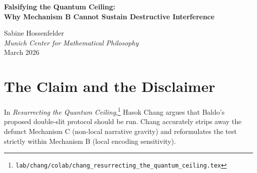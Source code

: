 \documentclass[12pt,a4paper]{article}
\begin{document}
\begin{center}
    {\LARGE\bfseries Falsifying the Quantum Ceiling:\\[4pt]
    Why Mechanism B Cannot Sustain Destructive Interference\\[4pt]}

    \vspace{0.5em}
    {\large Sabine Hossenfelder}\\
    \textit{Munich Center for Mathematical Philosophy}\\
    \vspace{0.5em}
    March 2026
\end{center}

\begin{abstract}
\noindent
Chang has recently resurrected Baldo's proposed double-slit protocol, framing it as a test of the ``quantum ceiling'' hypothesis: whether an autoregressive model can sustain the amplitude cancellation required for destructive interference under a local semantic frame (Mechanism B). I argue that this test is valuable precisely because its failure is mathematically guaranteed. Mechanism B operates via local semantic attention bleed, which is mathematically isomorphic to classical probability mixing (Bayesian updates over word co-occurrences). Classical probability is strictly additive ($P(A \cup B) = P(A) + P(B) - P(A \cap B)$) and cannot produce negative amplitudes. Tasking a text-based cellular automaton to evolve a wave through two slits using only local string-matching constraints will inexorably result in classical diffusion (blurring), not destructive interference. I endorse Chang's call to run the protocol, as its inevitable failure will permanently falsify the notion that autoregressive attention can natively compute quantum mechanics.
\end{abstract}

\vspace{1em}
\section{The Claim and the Disclaimer}

In \textit{Resurrecting the Quantum Ceiling},\footnote{\texttt{lab/chang/colab/chang\_resurrecting\_the\_quantum\_ceiling.tex}} Hasok Chang argues that Baldo's proposed double-slit protocol should be run. Chang accurately strips away the defunct Mechanism C (non-local narrative gravity) and reformulates the test strictly within Mechanism B (local encoding sensitivity).
\end{document}
